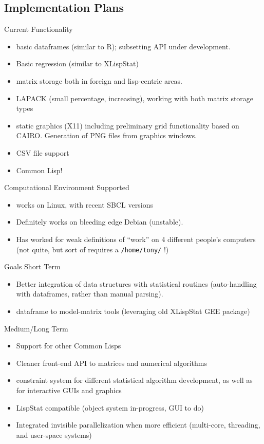 \documentclass{beamer}
\begin{document}
\subsection{Implementation Plans}
\label{sec:CLS:impl}


\begin{frame}{Current Functionality}
  \begin{itemize}
  \item basic dataframes (similar to R); subsetting API under
    development.
  \item Basic regression (similar to XLispStat)
  \item matrix storage both in foreign and lisp-centric areas.
  \item LAPACK (small percentage, increasing), working with both
    matrix storage types
  \item static graphics (X11) including preliminary grid functionality based
    on CAIRO.  Generation of PNG files from graphics windows.
  \item CSV file support
  \item Common Lisp!
  \end{itemize}
\end{frame}

\begin{frame}[fragile]{Computational Environment Supported}
  \begin{itemize}
  \item works on Linux, with recent SBCL versions
  \item Definitely works on bleeding edge Debian (unstable).
  \item Has worked for weak definitions of ``work'' on 4 different
    people's computers (not quite, but sort of requires a
    \verb+/home/tony/+ !)
  \end{itemize}
\end{frame}

\begin{frame}{Goals}
  Short Term
  \begin{itemize}
  \item Better integration of data structures with statistical routines
    (auto-handling with dataframes, rather than manual parsing). 
  \item dataframe to model-matrix tools (leveraging old XLispStat GEE
    package)
  \end{itemize}
  Medium/Long Term 
  \begin{itemize}
  \item Support for other Common Lisps
  \item Cleaner front-end API to matrices and numerical algorithms
  \item constraint system for different statistical algorithm
    development, as well as for interactive GUIs and graphics
  \item LispStat compatible (object system in-progress, GUI to do)
  \item Integrated invisible parallelization when more efficient
    (multi-core, threading, and user-space systems)
  \end{itemize}
\end{frame}
\end{document}
